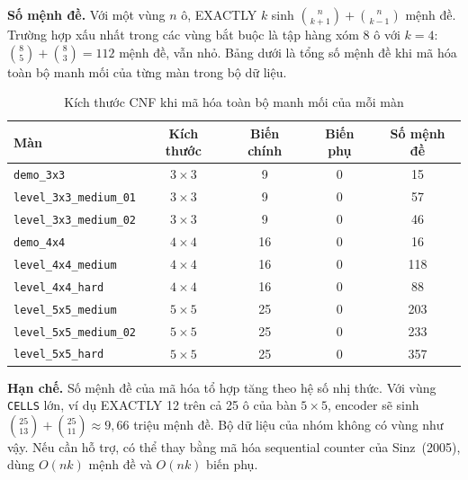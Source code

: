 \textbf{Số mệnh đề.} Với một vùng $n$ ô, EXACTLY $k$ sinh
$\binom{n}{k+1} + \binom{n}{k-1}$ mệnh đề. Trường hợp xấu nhất trong các vùng
bắt buộc là tập hàng xóm 8 ô với $k=4$: $\binom{8}{5}+\binom{8}{3} = 112$ mệnh
đề, vẫn nhỏ. Bảng dưới là tổng số mệnh đề khi mã hóa toàn bộ manh mối của
từng màn trong bộ dữ liệu.

\begin{table}[H]
\centering
\begin{tabular}{lcccc}
\toprule
Màn & Kích thước & Biến chính & Biến phụ & Số mệnh đề \\
\midrule
\texttt{demo\_3x3} & $3\times3$ & 9 & 0 & 15 \\
\texttt{level\_3x3\_medium\_01} & $3\times3$ & 9 & 0 & 57 \\
\texttt{level\_3x3\_medium\_02} & $3\times3$ & 9 & 0 & 46 \\
\texttt{demo\_4x4} & $4\times4$ & 16 & 0 & 16 \\
\texttt{level\_4x4\_medium} & $4\times4$ & 16 & 0 & 118 \\
\texttt{level\_4x4\_hard} & $4\times4$ & 16 & 0 & 88 \\
\texttt{level\_5x5\_medium} & $5\times5$ & 25 & 0 & 203 \\
\texttt{level\_5x5\_medium\_02} & $5\times5$ & 25 & 0 & 233 \\
\texttt{level\_5x5\_hard} & $5\times5$ & 25 & 0 & 357 \\
\bottomrule
\end{tabular}
\caption{Kích thước CNF khi mã hóa toàn bộ manh mối của mỗi màn}
\end{table}

\textbf{Hạn chế.} Số mệnh đề của mã hóa tổ hợp tăng theo hệ số nhị thức. Với
vùng \texttt{CELLS} lớn, ví dụ EXACTLY 12 trên cả 25 ô của bàn $5\times5$,
encoder sẽ sinh $\binom{25}{13}+\binom{25}{11} \approx 9{,}66$ triệu mệnh đề.
Bộ dữ liệu của nhóm không có vùng như vậy. Nếu cần hỗ trợ, có thể thay bằng
mã hóa sequential counter của Sinz~(2005), dùng $O(nk)$ mệnh đề và $O(nk)$
biến phụ.

